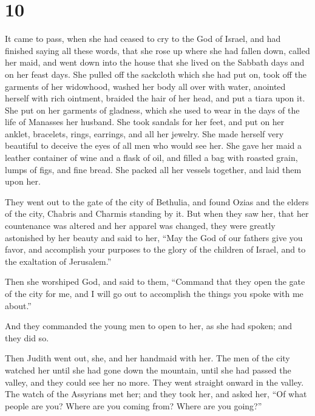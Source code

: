 \hypertarget{section-9}{%
\section{10}\label{section-9}}

 It came to pass, when she had ceased to cry to the God of
Israel, and had finished saying all these words,  that she
rose up where she had fallen down, called her maid, and went down into
the house that she lived on the Sabbath days and on her feast days.
 She pulled off the sackcloth which she had put on, took
off the garments of her widowhood, washed her body all over with water,
anointed herself with rich ointment, braided the hair of her head, and
put a tiara upon it. She put on her garments of gladness, which she used
to wear in the days of the life of Manasses her husband. 
She took sandals for her feet, and put on her anklet, bracelets, rings,
earrings, and all her jewelry. She made herself very beautiful to
deceive the eyes of all men who would see her.  She gave
her maid a leather container of wine and a flask of oil, and filled a
bag with roasted grain, lumps of figs, and fine bread. She packed all
her vessels together, and laid them upon her.

 They went out to the gate of the city of Bethulia, and
found Ozias and the elders of the city, Chabris and Charmis standing by
it.  But when they saw her, that her countenance was
altered and her apparel was changed, they were greatly astonished by her
beauty and said to her,  ``May the God of our fathers give
you favor, and accomplish your purposes to the glory of the children of
Israel, and to the exaltation of Jerusalem.''

Then she worshiped God,  and said to them, ``Command that
they open the gate of the city for me, and I will go out to accomplish
the things you spoke with me about.''

And they commanded the young men to open to her, as she had spoken;
 and they did so.

Then Judith went out, she, and her handmaid with her. The men of the
city watched her until she had gone down the mountain, until she had
passed the valley, and they could see her no more.  They
went straight onward in the valley. The watch of the Assyrians met her;
 and they took her, and asked her, ``Of what people are
you? Where are you coming from? Where are you going?''

